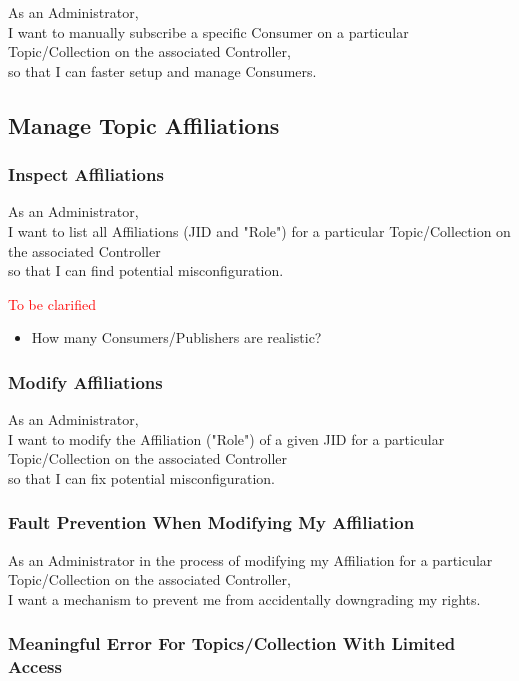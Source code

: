 As an Administrator, \\
I want to manually subscribe a specific Consumer on a particular Topic/Collection on the associated Controller, \\
so that I can faster setup and manage Consumers.

\subsection{Manage Topic Affiliations}
\subsubsection{Inspect Affiliations}

As an Administrator,\\
I want to list all Affiliations (JID and "Role") for a particular Topic/Collection on the associated Controller \\
so that I can find potential misconfiguration.

\noindent\textcolor{red}{To be clarified}

\begin{itemize}
    \item How many Consumers/Publishers are realistic?
\end{itemize}


\subsubsection{Modify Affiliations}

As an Administrator,\\
I want to modify the Affiliation ("Role") of a given JID for a particular Topic/Collection on the associated Controller \\
so that I can fix potential misconfiguration.

\subsubsection{Fault Prevention When Modifying My Affiliation}

As an Administrator in the process of modifying my Affiliation for a particular Topic/Collection on the associated Controller,\\
I want a mechanism to prevent me from accidentally downgrading my rights.

\subsubsection{Meaningful Error For Topics/Collection With Limited Access}

